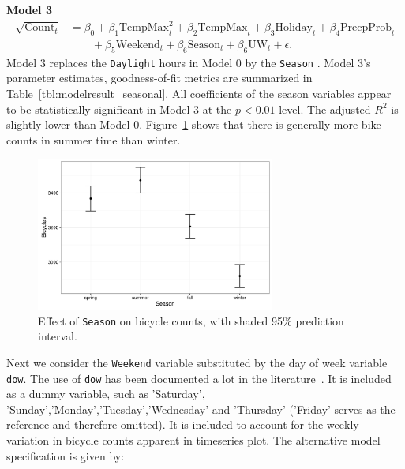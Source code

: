 \documentclass [11pt, proquest] {uwthesis}[2015/03/03]
\begin{document}
\textbf{Model 3}
\begin{align}
\sqrt{\text{Count}_t} &= \beta_0 + \beta_1 \text{TempMax}^2_t + \beta_2 \text{TempMax}_t + \beta_3 \text{Holiday}_t + \beta_4 \text{PrecpProb}_t  \nonumber\\
&\qquad + \beta_5 \text{Weekend}_t + \beta_6 \text{Season}_t + \beta_6 \text{UW}_t + \epsilon.\label{eqref:model3}
\end{align}
Model 3 replaces the \texttt{Daylight} hours in Model 0 by the \texttt{Season} . Model 3's parameter estimates, goodness-of-fit metrics are summarized in Table~\ref{tbl:modelresult_seasonal}. All coefficients of the season variables appear to be  statistically significant in Model 3 at the $p<0.01$ level. The adjusted $R^2$ is slightly lower than Model 0. Figure~\ref{fig:season} shows that there is generally more bike counts in summer time than winter.

\begin{figure}
\centering
  \includegraphics[width=0.7\textwidth]{figures/sim/season} 
 \caption{Effect of \texttt{Season} on bicycle counts, with shaded 95\% prediction interval.}
 \label{fig:season}
\end{figure}

Next we consider the \texttt{Weekend} variable substituted by the day of week variable \texttt{dow}. The use of \texttt{dow} has been documented a lot in the literature~\cite{Miranda-Moreno:2011aa,Ahmed12}. It is included as a dummy variable, such as 'Saturday', 'Sunday','Monday','Tuesday','Wednesday' and 'Thursday' ('Friday' serves as the reference and therefore omitted). It is included to account for the weekly variation in bicycle counts apparent in timeseries plot. The alternative model specification is given by:
\end{document}
